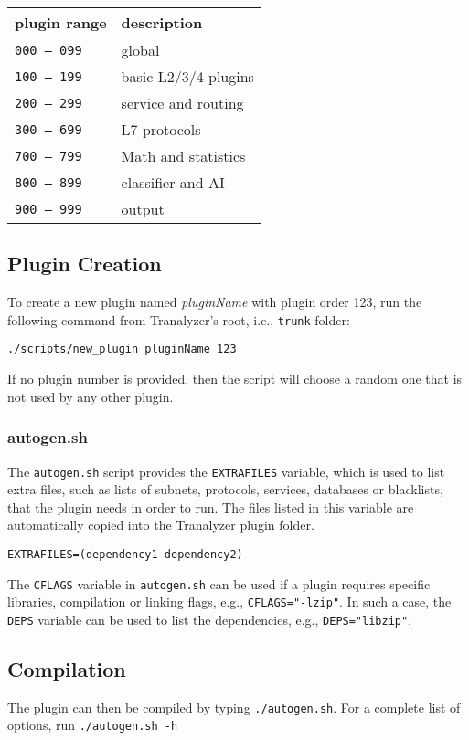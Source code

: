 \documentclass[documentation]{subfiles}
\begin{document}
\begin{longtable}{ll}
    \toprule
    {\bf plugin range} & {\bf description}\\
    \midrule\endhead%
    {\tt 000 -- 099} & global\\
    {\tt 100 -- 199} & basic L2/3/4 plugins\\
    {\tt 200 -- 299} & service and routing\\
    {\tt 300 -- 699} & L7 protocols\\
    {\tt 700 -- 799} & Math and statistics\\
    {\tt 800 -- 899} & classifier and AI\\
    {\tt 900 -- 999} & output\\
    \bottomrule
\end{longtable}

\subsection{Plugin Creation}
To create a new plugin named {\em pluginName} with plugin order 123, run the following command from Tranalyzer's root, i.e., {\tt trunk} folder:
\begin{center}
{\tt ./scripts/new\_plugin pluginName 123}
\end{center}

If no plugin number is provided, then the script will choose a random one that is not used by any other plugin.

\subsubsection{autogen.sh}
The {\tt autogen.sh} script provides the {\tt EXTRAFILES} variable, which is used to list extra files, such as lists of subnets, protocols, services, databases or blacklists, that the plugin needs in order to run.
The files listed in this variable are automatically copied into the Tranalyzer plugin folder.
\begin{center}
{\tt EXTRAFILES=(dependency1 dependency2)}
\end{center}

The {\tt CFLAGS} variable in {\tt autogen.sh} can be used if a plugin requires specific libraries, compilation or linking flags, e.g., {\tt CFLAGS="-lzip"}.
In such a case, the {\tt DEPS} variable can be used to list the dependencies, e.g., {\tt DEPS="libzip"}.

\subsection{Compilation}
The plugin can then be compiled by typing {\tt ./autogen.sh}.
For a complete list of options, run {\tt ./autogen.sh -h}
\end{document}
